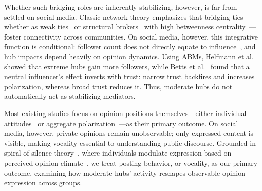 \documentclass{svproc}
\begin{document}
Whether such bridging roles are inherently stabilizing, however, is
far from settled on social media. Classic network theory emphasizes
that bridging ties—whether as weak ties~\cite{granovetter1973} or
structural brokers~\cite{burt1992} with high betweenness
centrality~\cite{freeman1977}—foster connectivity across
communities. On social media, however, this integrative function is
conditional: follower count does not directly equate to
influence~\cite{cha2010}, and hub impacts depend heavily on opinion
dynamics. Using ABMs, Helfmann et al.~\cite{helfm2023} showed that
extreme hubs gain more followers, while Betts et al.~\cite{betts2023}
found that a neutral influencer's effect inverts with trust: narrow
trust backfires and increases polarization, whereas broad trust
reduces it. Thus, moderate hubs do not automatically act as
stabilizing mediators.
\par

Most existing studies focus on opinion positions themselves—either
individual attitudes~\cite{helfm2023} or aggregate
polarization~\cite{betts2023,sasahara2020}—as their primary
outcome. On social media, however, private opinions remain
unobservable; only expressed content is visible, making vocality
essential to understanding public discourse. Grounded in
spiral-of-silence theory~\cite{noelle-neumann1974}, where individuals
modulate expression based on perceived opinion
climate~\cite{krassa1988}, we treat posting behavior, or vocality, as
our primary outcome, examining how moderate hubs' activity reshapes
observable opinion expression across groups.
\end{document}
